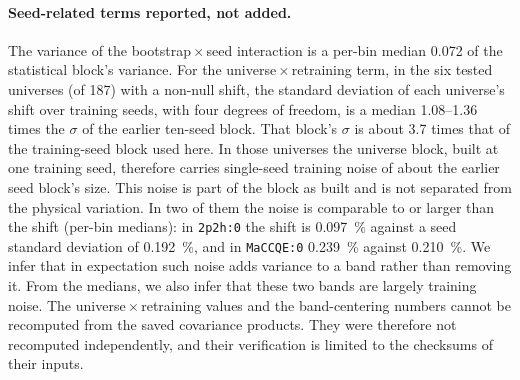 \paragraph{Seed-related terms reported, not added.} The variance of the bootstrap\,$\times$\,seed interaction is a per-bin median 0.072 of the statistical block's variance. For the universe\,$\times$\,retraining term, in the six tested universes (of 187) with a non-null shift, the standard deviation of each universe's shift over training seeds, with four degrees of freedom, is a median 1.08--1.36 times the $\sigma$ of the earlier ten-seed block. That block's $\sigma$ is about 3.7 times that of the training-seed block used here. In those universes the universe block, built at one training seed, therefore carries single-seed training noise of about the earlier seed block's size. This noise is part of the block as built and is not separated from the physical variation. In two of them the noise is comparable to or larger than the shift (per-bin medians): in \texttt{2p2h:0} the shift is \SI{0.097}{\percent} against a seed standard deviation of \SI{0.192}{\percent}, and in \texttt{MaCCQE:0} \SI{0.239}{\percent} against \SI{0.210}{\percent}. We infer that in expectation such noise adds variance to a band rather than removing it. From the medians, we also infer that these two bands are largely training noise. The universe\,$\times$\,retraining values and the band-centering numbers cannot be recomputed from the saved covariance products. They were therefore not recomputed independently, and their verification is limited to the checksums of their inputs.


